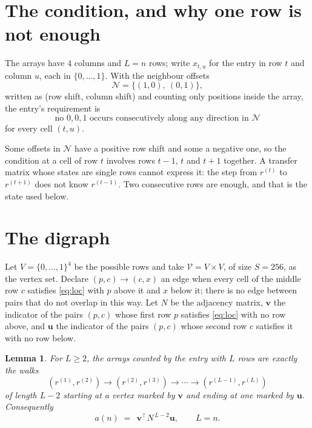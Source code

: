 \documentclass[11pt,a4paper]{article}
\theoremstyle{plain}
\newtheorem{lemma}[theorem]{Lemma}
\theoremstyle{definition}
\begin{document}
\section{The condition, and why one row is not enough}

The arrays have $4$ columns and $L=n$ rows; write $x_{t,u}$ for the entry in
row $t$ and column $u$, each in $\{0,\dots,1\}$. With the neighbour offsets
\[
\mathcal N=\{(1,0),\ (0,1)\},
\]
written as (row shift, column shift) and counting only positions inside the array, the
entry's requirement is
\begin{equation}\label{eq:loc}
\text{no }0,0,1\text{ occurs consecutively along any direction in }\mathcal N
\end{equation}
for every cell $(t,u)$.

Some offsets in $\mathcal N$ have a positive row shift and some a negative one, so the
condition at a cell of row $t$ involves rows $t-1$, $t$ and $t+1$ together. A transfer
matrix whose states are single rows cannot express it: the step from $r^{(t)}$ to
$r^{(t+1)}$ does not know $r^{(t-1)}$. Two consecutive rows are enough, and that is
the state used below.

\section{The digraph}

Let $V=\{0,\dots,1\}^{4}$ be the possible rows and take
$\mathcal V=V\times V$, of size $S=256$, as the vertex set. Declare $(p,c)\to(c,x)$ an edge
when every cell of the middle row $c$ satisfies \eqref{eq:loc} with $p$ above it and $x$
below it; there is no edge between pairs that do not overlap in this way. Let $N$ be the
adjacency matrix, $\mathbf{v}$ the indicator of the pairs $(p,c)$ whose first row $p$
satisfies \eqref{eq:loc} with no row above, and $\mathbf{u}$ the indicator of
the pairs $(p,c)$ whose second row $c$ satisfies it with no row below.

\begin{lemma}\label{lem:walk}
For $L\ge2$, the arrays counted by the entry with $L$ rows are exactly the walks
\[
(r^{(1)},r^{(2)})\to(r^{(2)},r^{(3)})\to\cdots\to(r^{(L-1)},r^{(L)})
\]
of length $L-2$ starting at a vertex marked by $\mathbf{v}$ and ending at one marked by
$\mathbf{u}$. Consequently
\[
a(n)\;=\;\,\mathbf{v}^{\!\top}N^{\,L-2}\mathbf{u},\qquad L=n .
\]
\end{lemma}
\end{document}
